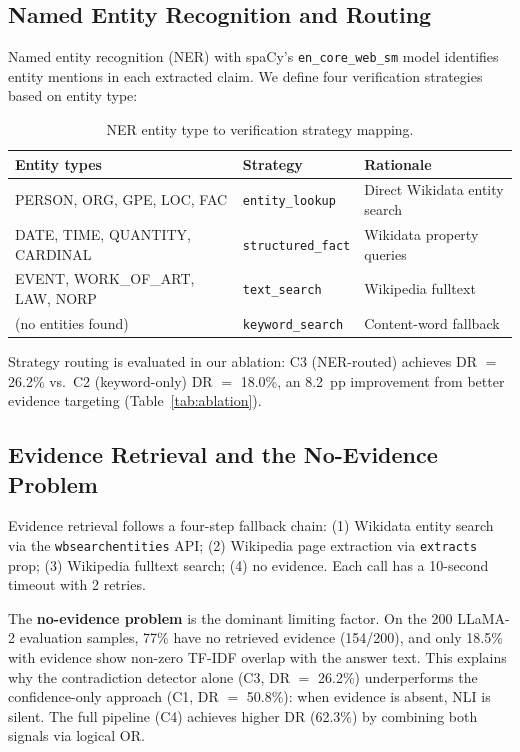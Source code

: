 \documentclass[11pt,a4paper]{article}
\begin{document}
\subsection{Named Entity Recognition and Routing}

Named entity recognition (NER) with spaCy's \texttt{en\_core\_web\_sm} model
identifies entity mentions in each extracted claim. We define four verification
strategies based on entity type:

\begin{table}[htb]
\centering
\caption{NER entity type to verification strategy mapping.}
\label{tab:routing}
\small
\begin{tabular}{lll}
\toprule
\textbf{Entity types} & \textbf{Strategy} & \textbf{Rationale} \\
\midrule
PERSON, ORG, GPE, LOC, FAC  & \texttt{entity\_lookup}   & Direct Wikidata entity search \\
DATE, TIME, QUANTITY, CARDINAL & \texttt{structured\_fact} & Wikidata property queries \\
EVENT, WORK\_OF\_ART, LAW, NORP & \texttt{text\_search}    & Wikipedia fulltext \\
(no entities found)          & \texttt{keyword\_search}  & Content-word fallback \\
\bottomrule
\end{tabular}
\end{table}

Strategy routing is evaluated in our ablation: C3 (NER-routed) achieves
DR $=$ 26.2\% vs.\ C2 (keyword-only) DR $=$ 18.0\%, an 8.2~pp improvement
from better evidence targeting (Table~\ref{tab:ablation}).

\subsection{Evidence Retrieval and the No-Evidence Problem}

Evidence retrieval follows a four-step fallback chain: (1) Wikidata entity
search via the \texttt{wbsearchentities} API; (2) Wikipedia page extraction via
\texttt{extracts} prop; (3) Wikipedia fulltext search; (4) no evidence. Each
call has a 10-second timeout with 2 retries.

The \textbf{no-evidence problem} is the dominant limiting factor. On the 200
LLaMA-2 evaluation samples, 77\% have no retrieved evidence (154/200), and only
18.5\% with evidence show non-zero TF-IDF overlap with the answer text. This
explains why the contradiction detector alone (C3, DR $=$ 26.2\%) underperforms
the confidence-only approach (C1, DR $=$ 50.8\%): when evidence is absent, NLI
is silent. The full pipeline (C4) achieves higher DR (62.3\%) by combining both
signals via logical OR.
\end{document}
